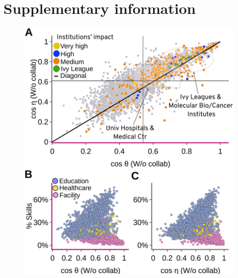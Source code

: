\documentclass[draft,final]{vutinfth} %
\begin{document}
\newpage

\section{Supplementary information~\label{SI}}


\begin{figure} [!ht] %
\centering
  \includegraphics[width=0.5\linewidth]{figures_alignment/figure3abc_wo_collaboration.png}

\end{figure}
\end{document}
